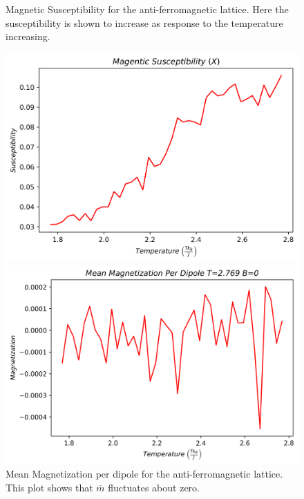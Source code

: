 \documentclass[twocolumn]{article}
\begin{document}
\begin{figure}[H]
\caption{Magnetic Susceptibility for the anti-ferromagnetic lattice. Here the susceptibility is shown to increase as response to the temperature increasing.}
\centering
\includegraphics[scale=.45]{AntiMS128}
\caption{Mean Magnetization per dipole for the anti-ferromagnetic lattice. This plot shows that $\overline{m}$ fluctuates about zero.}
\centering
\includegraphics[scale=.45]{AntiMMT}
\end{figure}
\end{document}

